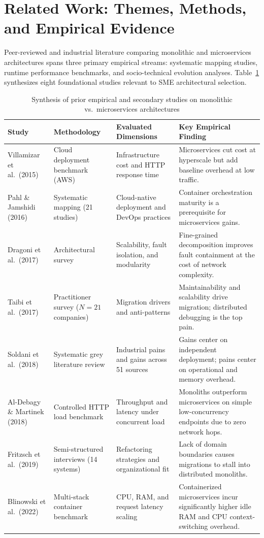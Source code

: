 \section{Related Work: Themes, Methods, and Empirical Evidence}
\label{sec:related}

Peer-reviewed and industrial literature comparing monolithic and microservices architectures spans three primary empirical streams: systematic mapping studies, runtime performance benchmarks, and socio-technical evolution analyses. Table~\ref{tab:lit-synthesis} synthesizes eight foundational studies relevant to SME architectural selection.

\begin{table}[h]
  \caption{Synthesis of prior empirical and secondary studies on monolithic vs.\ microservices architectures}
  \label{tab:lit-synthesis}
  \centering
  \begin{tabular}{p{2.7cm}p{2.8cm}p{3.8cm}p{4.3cm}}
    \toprule
    \textbf{Study} & \textbf{Methodology} & \textbf{Evaluated Dimensions} & \textbf{Key Empirical Finding} \\
    \midrule
    Villamizar et al.\ (2015) \cite{villamizar2015} & Cloud deployment benchmark (AWS) & Infrastructure cost and HTTP response time & Microservices cut cost at hyperscale but add baseline overhead at low traffic. \\
    Pahl \& Jamshidi (2016) \cite{pahl2016} & Systematic mapping (21 studies) & Cloud-native deployment and DevOps practices & Container orchestration maturity is a prerequisite for microservices gains. \\
    Dragoni et al.\ (2017) \cite{dragoni2017} & Architectural survey & Scalability, fault isolation, and modularity & Fine-grained decomposition improves fault containment at the cost of network complexity. \\
    Taibi et al.\ (2017) \cite{taibi2017} & Practitioner survey ($N=21$ companies) & Migration drivers and anti-patterns & Maintainability and scalability drive migration; distributed debugging is the top pain. \\
    Soldani et al.\ (2018) \cite{soldani2018} & Systematic grey literature review & Industrial pains and gains across 51 sources & Gains center on independent deployment; pains center on operational and memory overhead. \\
    Al-Debagy \& Martinek (2018) \cite{aldebis2020} & Controlled HTTP load benchmark & Throughput and latency under concurrent load & Monoliths outperform microservices on simple low-concurrency endpoints due to zero network hops. \\
    Fritzsch et al.\ (2019) \cite{fritzsch2019} & Semi-structured interviews (14 systems) & Refactoring strategies and organizational fit & Lack of domain boundaries causes migrations to stall into distributed monoliths. \\
    Blinowski et al.\ (2022) \cite{blinov2021} & Multi-stack container benchmark & CPU, RAM, and request latency scaling & Containerized microservices incur significantly higher idle RAM and CPU context-switching overhead. \\
    \bottomrule
  \end{tabular}
\end{table}


